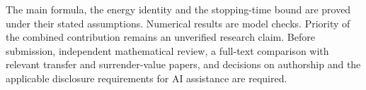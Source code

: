 \documentclass[11pt,a4paper]{article}
\theoremstyle{definition}\newtheorem{definition}[theorem]{Definition}
\theoremstyle{remark}\newtheorem{remark}[theorem]{Remark}
\begin{document}
The main formula, the energy identity and the stopping-time bound are proved under their stated assumptions. Numerical results are model checks. Priority of the combined contribution remains an unverified research claim. Before submission, independent mathematical review, a full-text comparison with relevant transfer and surrender-value papers, and decisions on authorship and the applicable disclosure requirements for AI assistance are required.



\end{document}
